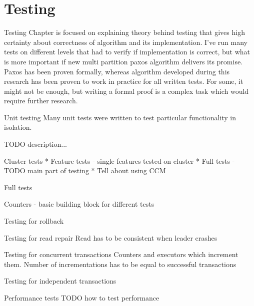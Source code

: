 \chapter{Testing}\label{chapter:testing}

Testing
 Chapter is focused on explaining theory behind testing that gives high certainty about correctness of algorithm and its implementation.  I’ve run many tests on different levels that had to verify if implementation is correct, but what is more important if new multi partition paxos algorithm delivers its promise. 
Paxos has been proven formally, whereas algorithm developed during this research has been proven to work in practice for all written tests. For some, it might not be enough, but writing a formal proof is a complex task which would require further research.


Unit testing
Many unit tests were written to test particular functionality in isolation. 


TODO description...


Cluster tests
* Feature tests - single features tested on cluster
* Full tests - TODO main part of testing
* Tell about using CCM


Full tests


Counters - basic building block for different tests


Testing for rollback


Testing for read repair
Read has to be consistent when leader crashes


Testing for concurrent transactions
Counters and executors which increment them. Number of incrementations has to be equal to successful transactions


Testing for independent transactions


Performance tests
TODO how to test performance 
